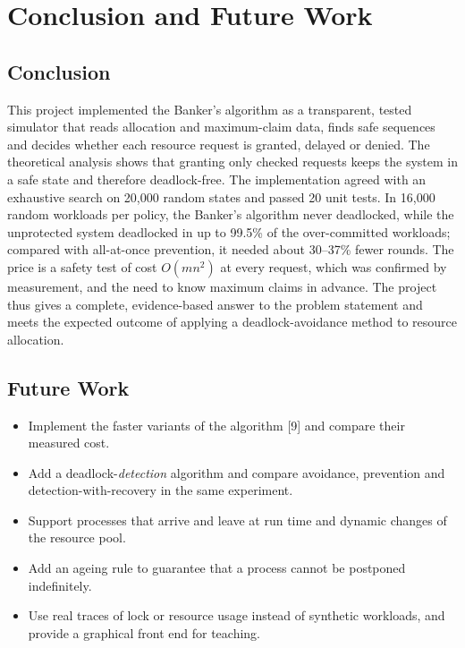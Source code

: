 \documentclass[11pt,a4paper]{report}
\begin{document}
\section{Conclusion and Future Work}
\subsection{Conclusion}
This project implemented the Banker's algorithm as a transparent, tested simulator that reads allocation and maximum-claim data, finds safe sequences and decides whether each resource request is granted, delayed or denied. The theoretical analysis shows that granting only checked requests keeps the system in a safe state and therefore deadlock-free. The implementation agreed with an exhaustive search on 20{,}000 random states and passed 20 unit tests. In 16{,}000 random workloads per policy, the Banker's algorithm never deadlocked, while the unprotected system deadlocked in up to 99.5\% of the over-committed workloads; compared with all-at-once prevention, it needed about 30--37\% fewer rounds. The price is a safety test of cost $O(mn^2)$ at every request, which was confirmed by measurement, and the need to know maximum claims in advance. The project thus gives a complete, evidence-based answer to the problem statement and meets the expected outcome of applying a deadlock-avoidance method to resource allocation.

\subsection{Future Work}
\begin{itemize}
    \item Implement the faster variants of the algorithm [9] and compare their measured cost.
    \item Add a deadlock-\emph{detection} algorithm and compare avoidance, prevention and detection-with-recovery in the same experiment.
    \item Support processes that arrive and leave at run time and dynamic changes of the resource pool.
    \item Add an ageing rule to guarantee that a process cannot be postponed indefinitely.
    \item Use real traces of lock or resource usage instead of synthetic workloads, and provide a graphical front end for teaching.
\end{itemize}
\end{document}
